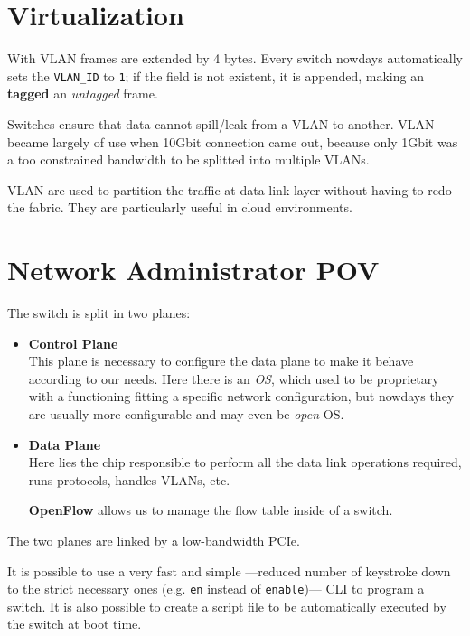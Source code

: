 \section{Virtualization}

With VLAN frames are extended by 4 bytes. Every switch nowdays automatically sets the \texttt{VLAN\_ID} to \texttt{1}; if the field is not existent, it is appended, making an \textbf{tagged} an \textit{untagged} frame.

Switches ensure that data cannot spill/leak from a VLAN to another.
VLAN became largely of use when 10Gbit connection came out, because only 1Gbit was a too constrained bandwidth to be splitted into multiple VLANs. 

VLAN are used to partition the traffic at data link layer without having to redo the fabric. They are particularly useful in cloud environments.

\section{Network Administrator POV}
The switch is split in two planes:
\begin{itemize}
   \item \textbf{Control Plane}\\
   This plane is necessary to configure the data plane to make it behave according to our needs.
   Here there is an \textit{OS}, which used to be proprietary with a functioning fitting a specific network configuration, but nowdays they are usually more configurable and may even be \textit{open} OS.
   
   \item \textbf{Data Plane}\\
   Here lies the chip responsible to perform all the data link operations required, runs protocols, handles VLANs, etc.

   \textbf{OpenFlow} allows us to manage the flow table inside of a switch.
\end{itemize}

The two planes are linked by a low-bandwidth PCIe.


It is possible to use a very fast and simple ---reduced number of keystroke down to the strict necessary ones (e.g. \texttt{en} instead of \texttt{enable})--- CLI to program a switch. It is also possible to create a script file to be automatically executed by the switch at boot time.

